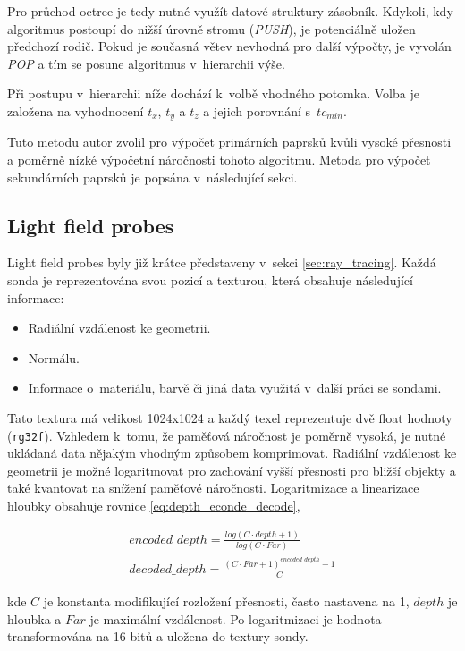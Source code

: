 Pro průchod octree je tedy nutné využít datové struktury zásobník. Kdykoli, kdy algoritmus postoupí do nižší úrovně stromu (\textit{PUSH}), je potenciálně uložen předchozí rodič. Pokud je současná větev nevhodná pro další výpočty, je vyvolán \textit{POP} a tím se posune algoritmus v~hierarchii výše.

Při postupu v~hierarchii níže dochází k~volbě vhodného potomka. Volba je založena na vyhodnocení $t_x$, $t_y$ a $t_z$ a jejich porovnání s~$tc_{min}$.

Tuto metodu autor zvolil pro výpočet primárních paprsků kvůli vysoké přesnosti a poměrně nízké výpočetní náročnosti tohoto algoritmu. Metoda pro výpočet sekundárních paprsků je popsána v~následující sekci.



\subsection{Light field probes}\label{sec:lfp_design}
Light field probes byly již krátce představeny v~sekci \ref{sec:ray_tracing}. Každá sonda je reprezentována svou pozicí a texturou, která obsahuje následující informace:
\begin{itemize}
 \item Radiální vzdálenost ke geometrii.
 \item Normálu.
 \item Informace o~materiálu, barvě či jiná data využitá v~další práci se sondami.
\end{itemize}

Tato textura má velikost 1024x1024 a každý texel reprezentuje dvě float hodnoty (\texttt{rg32f}). Vzhledem k~tomu, že paměťová náročnost je poměrně vysoká, je nutné ukládaná data nějakým vhodným způsobem komprimovat. Radiální vzdálenost ke geometrii je možné logaritmovat pro zachování vyšší přesnosti pro bližší objekty a také kvantovat na snížení paměťové náročnosti. Logaritmizace a linearizace hloubky obsahuje rovnice \ref{eq:depth_econde_decode},

\begin{equation} \label{eq:depth_econde_decode}
	\begin{gathered}
		encoded\_depth = \frac{log(C \cdot depth + 1)}{log(C \cdot Far)}\\
		decoded\_depth = \frac{(C \cdot Far + 1)^{encoded\_depth} - 1}{C}
	\end{gathered}
\end{equation}

kde $C$ je konstanta modifikující rozložení přesnosti, často nastavena na 1, $depth$ je hloubka a $Far$ je maximální vzdálenost. Po logaritmizaci je hodnota transformována na 16 bitů a uložena do textury sondy.

